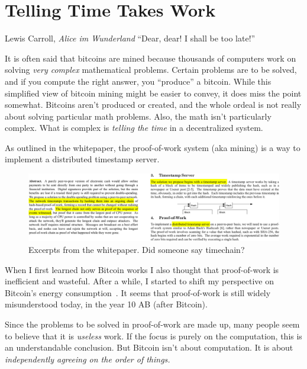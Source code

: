 \chapter{Telling Time Takes Work}
\label{les:17}

\begin{chapquote}{Lewis Carroll, \textit{Alice im Wunderland}}
\enquote{Dear, dear! I shall be too late!}
\end{chapquote}

It is often said that bitcoins are mined because thousands of computers
work on solving \textit{very complex} mathematical problems. Certain problems
are to be solved, and if you compute the right answer, you \enquote{produce} a
bitcoin. While this simplified view of bitcoin mining might be easier to
convey, it does miss the point somewhat. Bitcoins aren't produced or
created, and the whole ordeal is not really about solving particular
math problems. Also, the math isn't particularly complex. What is
complex is \textit{telling the time} in a decentralized system.

As outlined in the whitepaper, the proof-of-work system (aka mining) is
a way to implement a distributed timestamp server.

\begin{figure}
  \includegraphics{assets/images/bitcoin-whitepaper-timestamp-wide.png}
  \caption{Excerpts from the whitepaper. Did someone say timechain?}
  \label{fig:bitcoin-whitepaper-timestamp-wide}
\end{figure}

When I first learned how Bitcoin works I also thought that proof-of-work
is inefficient and wasteful. After a while, I started to shift my
perspective on Bitcoin's energy consumption~\cite{gigi:energy}. It seems that
proof-of-work is still widely misunderstood today, in the year 10 AB
(after Bitcoin).

Since the problems to be solved in proof-of-work are made up, many
people seem to believe that it is \textit{useless} work. If the focus is purely
on the computation, this is an understandable conclusion. But Bitcoin
isn't about computation. It is about \textit{independently agreeing on the
order of things.}

